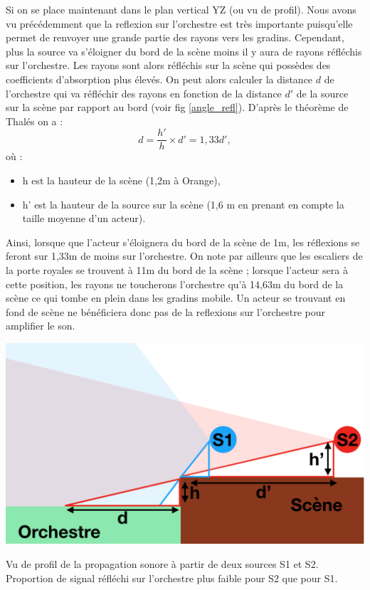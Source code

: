 Si on se place maintenant dans le plan vertical YZ (ou vu de profil). Nous avons vu précédemment que la reflexion sur l'orchestre est très importante puisqu'elle permet de renvoyer une grande partie des rayons vers les gradins. Cependant, plus la source va s'éloigner du bord de la scène moins il y aura de rayons réfléchis sur l'orchestre. Les rayons sont alors réfléchis sur la scène qui possèdes des coefficients d'absorption plus élevés. On peut alors calculer la distance $d$ de l'orchestre qui va réfléchir des rayons en fonction de la distance $d'$ de la source sur la scène par rapport au bord (voir fig \ref{angle_refl}). D'après le théorème de Thalés on a :
\begin{equation}
d = \frac{h'}{h}\times d' = 1,33d',
\end{equation}
où :
\begin{itemize}
\item h est la hauteur de la scène (1,2m à Orange),
\item h' est la hauteur de la source sur la scène (1,6 m en prenant en compte la taille moyenne d'un acteur).
\end{itemize}
Ainsi, lorsque que l'acteur s'éloignera du bord de la scène de 1m, les réflexions se feront sur 1,33m de moins sur l'orchestre. On note par ailleurs que les escaliers de la porte royales se trouvent à 11m du bord de la scène ; lorsque l'acteur sera à cette position, les rayons ne toucherons l'orchestre qu'à 14,63m du bord de la scène ce qui tombe en plein dans les gradins mobile. Un acteur se trouvant en fond de scène ne bénéficiera donc pas de la reflexions sur l'orchestre pour amplifier le son.
\begin{figureth}
	\includegraphics[width=0.8\linewidth]{images/angle_refl}
	\caption{Vu de profil de la propagation sonore à partir de deux sources S1 et S2. Proportion de signal réfléchi sur l'orchestre plus faible pour S2 que pour S1.}
	\label{angle_refl}
\end{figureth}

